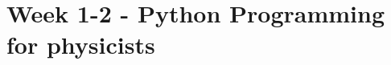 \documentclass[../main.tex]{subfiles}
\begin{document}
\section{Week 1-2 - Python Programming for physicists}

\printbibliography[heading=subbibliography]
\end{document}
